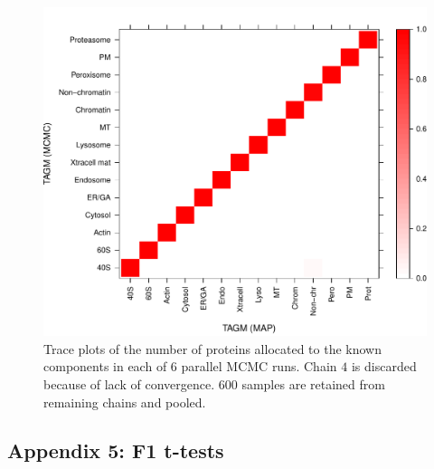 \documentclass[12pt,english]{article}\usepackage[]{graphicx}\usepackage[]{color}
\makeatletter
\def\maxwidth{ %
  \ifdim\Gin@nat@width>\linewidth
    \linewidth
  \else
    \Gin@nat@width
  \fi
}
\newenvironment{knitrout}{}{} %
\makeatother
\begin{document}
\begin{figure}[ht]
  \centering
\begin{knitrout}
\color{fgcolor}
\includegraphics[width=\maxwidth]{figure/unnamed-chunk-31-1} 

\end{knitrout}
  \caption{Trace plots of the number of proteins allocated to the known components in each of 6 parallel MCMC runs. Chain $4$ is discarded because of lack of convergence. $600$ samples are retained from remaining chains and pooled.}
  \label{figure::mcmcchains}
\end{figure}




\clearpage

\subsection{Appendix 5: F1 t-tests}\label{app::ttestf1}
\end{document}
